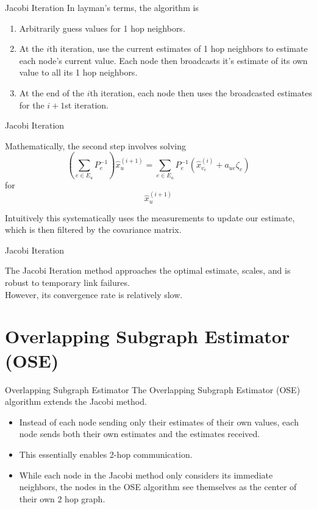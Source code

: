 \documentclass{beamer}
\begin{document}
\begin{frame}{Jacobi Iteration}
In layman's terms, the algorithm is
\begin{enumerate}
\item<1-> Arbitrarily guess values for 1 hop neighbors.
\item<2-> At the $i$th iteration, use the current estimates of 1 hop neighbors to
estimate each node's current value. Each node then broadcasts it's estimate of its own value
to all its 1 hop neighbors. 
\item<3-> At the end of the $i$th iteration, each node then uses the broadcasted
estimates for the $i+1$st iteration. 
\end{enumerate}
\end{frame}

\begin{frame}{Jacobi Iteration}
\begin{center}
Mathematically, the second step involves solving 
\[ \left(\sum_{e \in E_u} P_e^{-1}\right) \hat{x}_u^{(i+1)} = \sum_{e \in E_u}
P_e^{-1} \left( \hat{x}^{(i)}_{v_e} +a_{ue}\zeta_e \right) \]
for 
\[ \hat{x}_u^{(i+1)} \]
\end{center}
\end{frame}

\begin{frame}
\begin{center}
Intuitively this systematically uses the measurements to update our estimate,
which is then filtered by the covariance matrix. 
\end{center}
\end{frame}


\begin{frame}{Jacobi Iteration}
\begin{center}
The Jacobi Iteration method approaches the optimal estimate, scales, and is
robust to temporary link failures. 
\pause
\vspace{5mm}
\\
However, its convergence rate is relatively slow. 
\end{center}
\end{frame}

\section{Overlapping Subgraph Estimator (OSE)}
\begin{frame}{Overlapping Subgraph Estimator}
The Overlapping Subgraph Estimator (OSE) algorithm extends the Jacobi method.
\begin{itemize}
\item<1-> Instead of each node sending only their estimates of their own values, each node
sends both their own estimates and the estimates received.
\item<2-> This essentially enables 2-hop communication. 
\item<3-> While each node in the Jacobi method only considers its immediate
neighbors, the nodes in the OSE algorithm see themselves as the center of their
own 2 hop graph. 
\end{itemize}
\end{frame}
\end{document}

